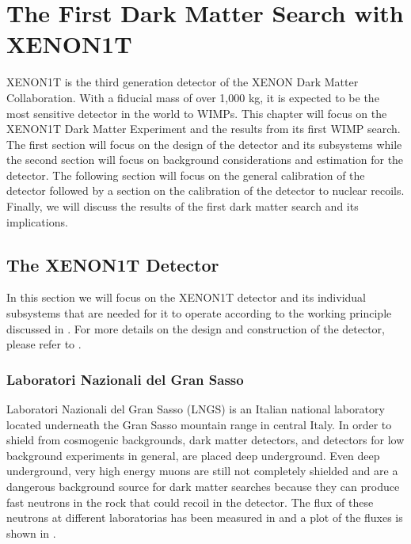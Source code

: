 

\pagestyle{cu}
\graphicspath{{./Chapter3/images/}}

\chapter[The First Dark Matter Search with XENON1T][The First Dark Matter Search with XENON1T]{The First Dark Matter Search with XENON1T}

XENON1T is the third generation detector of the XENON Dark Matter Collaboration.  With a fiducial mass of over 1,000 kg, it is expected to be the most sensitive detector in the world to WIMPs.  This chapter will focus on the XENON1T Dark Matter Experiment and the results from its first WIMP search.  The first section will focus on the design of the detector and its subsystems while the second section will focus on background considerations and estimation for the detector.  The following section will focus on the general calibration of the detector followed by a section on the calibration of the detector to nuclear recoils.  Finally, we will discuss the results of the first dark matter search and its implications.


\section{The XENON1T Detector}
\label{sec:xe1t_detector}

In this section we will focus on the XENON1T detector and its individual subsystems that are needed for it to operate according to the working principle discussed in .  For more details on the design and construction of the detector, please refer to .

\subsection{ Laboratori Nazionali del Gran Sasso}

 Laboratori Nazionali del Gran Sasso (LNGS)  is an Italian national laboratory located underneath the Gran Sasso mountain range in central Italy.  In order to shield from cosmogenic backgrounds, dark matter detectors, and detectors for low background experiments in general, are placed deep underground.  Even deep underground, very high energy muons are still not completely shielded and are a dangerous background source for dark matter searches because they can produce fast neutrons in the rock that could recoil in the detector.  The flux of these neutrons at different laboratorias has been measured in  and a plot of the fluxes is shown in .
 
